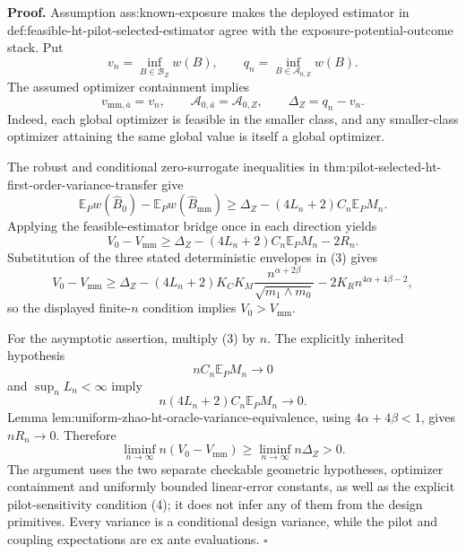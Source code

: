 \textbf{Proof.}
Assumption ass:known-exposure makes the deployed estimator in def:feasible-ht-pilot-selected-estimator agree with the exposure-potential-outcome stack.  Put
\[
v_n=\inf_{B\in\mathcal B_Z}w(B),
\qquad
q_n=\inf_{B\in\mathcal A_{0,Z}}w(B).
\]
The assumed optimizer containment implies
\[
v_{\mathrm{mm},\overline a}=v_n,
\qquad
\mathcal A_{0,\overline a}=\mathcal A_{0,Z},
\qquad
\Delta_Z=q_n-v_n.
\tag{1}
\]
Indeed, each global optimizer is feasible in the smaller class, and any smaller-class optimizer attaining the same global value is itself a global optimizer.

The robust and conditional zero-surrogate inequalities in thm:pilot-selected-ht-first-order-variance-transfer give
\[
\mathbb E_Pw(\widehat B_0)-\mathbb E_Pw(\widehat B_{\mathrm{mm}})
\ge\Delta_Z-(4L_n+2)C_n\mathbb E_PM_n.
\tag{2}
\]
Applying the feasible-estimator bridge once in each direction yields
\[
V_0-V_{\mathrm{mm}}
\ge\Delta_Z-(4L_n+2)C_n\mathbb E_PM_n-2R_n.
\tag{3}
\]
Substitution of the three stated deterministic envelopes in (3) gives
\[
V_0-V_{\mathrm{mm}}
\ge \Delta_Z
-(4L_n+2)K_CK_M\frac{n^{\alpha+2\beta}}{\sqrt{m_1\wedge m_0}}
-2K_Rn^{4\alpha+4\beta-2},
\]
so the displayed finite-\(n\) condition implies \(V_0>V_{\mathrm{mm}}\).

For the asymptotic assertion, multiply (3) by \(n\).  The explicitly inherited hypothesis
\[
nC_n\mathbb E_PM_n\longrightarrow0
\tag{4}
\]
and \(\sup_nL_n<\infty\) imply
\[
n(4L_n+2)C_n\mathbb E_PM_n\longrightarrow0.
\tag{5}
\]
Lemma lem:uniform-zhao-ht-oracle-variance-equivalence, using \(4\alpha+4\beta<1\), gives \(nR_n\to0\).  Therefore
\[
\liminf_{n\to\infty}n(V_0-V_{\mathrm{mm}})
\ge\liminf_{n\to\infty}n\Delta_Z>0.
\]
The argument uses the two separate checkable geometric hypotheses, optimizer containment and uniformly bounded linear-error constants, as well as the explicit pilot-sensitivity condition (4); it does not infer any of them from the design primitives.  Every variance is a conditional design variance, while the pilot and coupling expectations are ex ante evaluations. \(\square\)